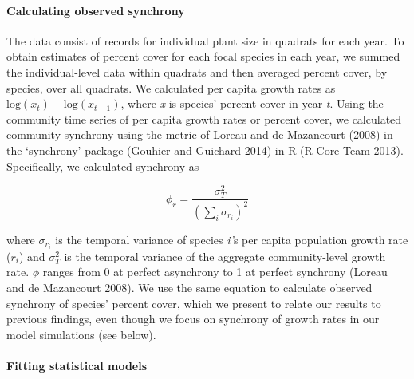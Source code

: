 \documentclass[12pt,]{article}
\begin{document}
\paragraph{Calculating observed
synchrony}\label{calculating-observed-synchrony}

The data consist of records for individual plant size in quadrats for
each year. To obtain estimates of percent cover for each focal species
in each year, we summed the individual-level data within quadrats and
then averaged percent cover, by species, over all quadrats. We
calculated per capita growth rates as
\(\text{log}(x_t) - \text{log}(x_{t-1})\), where \emph{x} is species'
percent cover in year \emph{t}. Using the community time series of per
capita growth rates or percent cover, we calculated community synchrony
using the metric of Loreau and {{de Mazancourt}} (2008) in the
`synchrony' package (Gouhier and Guichard 2014) in R (R Core Team 2013).
Specifically, we calculated synchrony as

\begin{equation}
\phi_r = \frac{\sigma^{2}_{T}}{(\sum_{i}\sigma_{r_{i}})^{2}}
\end{equation}

\noindent where \(\sigma_{r_{i}}\) is the temporal variance of species
\emph{i'}s per capita population growth rate (\(r_i\)) and
\(\sigma^{2}_{T}\) is the temporal variance of the aggregate
community-level growth rate. \(\phi\) ranges from 0 at perfect
asynchrony to 1 at perfect synchrony (Loreau and {{de Mazancourt}}
2008). We use the same equation to calculate observed synchrony of
species' percent cover, which we present to relate our results to
previous findings, even though we focus on synchrony of growth rates in
our model simulations (see below).

\paragraph{Fitting statistical models}\label{fitting-statistical-models}
\end{document}
